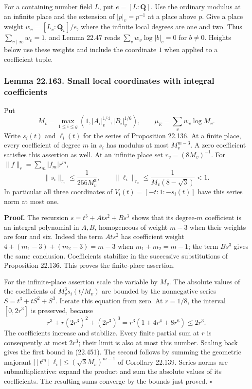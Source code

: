 \documentclass[
  11pt,
  a4paper,
]{article}
\begin{document}
For a containing number field \(L\), put \(e=[L:\mathbf Q]\). Use the
ordinary modulus at an infinite place and the extension of
\(|p|_v=p^{-1}\) at a place above \(p\). Give a place weight
\(w_v=[L_v:\mathbf Q_v]/e\), where the infinite local degrees are one
and two. Thus \(\sum_{v\mid\infty}w_v=1\), and Lemma 22.47 reads
\(\sum_vw_v\log|b|_v=0\) for \(b\ne0\). Heights below use these weights
and include the coordinate \(1\) when applied to a coefficient tuple.

\subsubsection{Lemma 22.163. Small local coordinates with integral
coefficients}\label{lemma-22.163.-small-local-coordinates-with-integral-coefficients}

Put \[
 M_v=\max_{1\le i\le g}
       (1,|A_i|_v^{1/4},|B_i|_v^{1/6}),\qquad
 \mu_E=\sum_vw_v\log M_v.
 \tag{22.450}
\] Write \(s_i(t)\) and \(\ell_i(t)\) for the series of Proposition
22.136. At a finite place, every coefficient of degree \(m\) in \(s_i\)
has modulus at most \(M_v^{m-3}\). A zero coefficient satisfies this
assertion as well. At an infinite place set \(r_v=(8M_v)^{-1}\). For
\(\|f\|_r=\sum_m|f_m|r^m\), \[
 \|s_i\|_{r_v}\le\frac1{256M_v^3},\qquad
 \|\ell_i\|_{r_v}\le\frac1{M_v(8-\sqrt3)}<1.
 \tag{22.451}
\] In particular all three coordinates of \(V_i(t)=[-t:1:-s_i(t)]\) have
this series norm at most one.

\textbf{Proof.} The recursion \(s=t^3+Ats^2+Bs^3\) shows that its
degree-\(m\) coefficient is an integral polynomial in \(A,B\),
homogeneous of weight \(m-3\) when their weights are four and six.
Indeed the term \(Ats^2\) has coefficient weight
\(4+(m_1-3)+(m_2-3)=m-3\) when \(m_1+m_2=m-1\); the term \(Bs^3\) gives
the same conclusion. Coefficients stabilize in the successive
substitutions of Proposition 22.136. This proves the finite-place
assertion.

For the infinite-place assertion scale the variable by \(M_v\). The
absolute values of the coefficients of \(M_v^3s_i(t/M_v)\) are bounded
by the nonnegative series \(S=t^3+tS^2+S^3\). Iterate this equation from
zero. At \(r=1/8\), the interval \([0,2r^3]\) is preserved, because \[
 r^3+r(2r^3)^2+(2r^3)^3
       =r^3(1+4r^4+8r^6)\le2r^3.
 \tag{22.452}
\] The coefficients increase and stabilize. Every finite partial sum at
\(r\) is consequently at most \(2r^3\); their limit is also at most this
number. Scaling back gives the first bound in (22.451). The second
follows by summing the geometric majorant
\(|[t^m]\ell_i|\le(\sqrt3 M_v)^{m-1}\) of Corollary 22.139. Series norms
are submultiplicative: expand the product and sum the absolute values of
its coefficients. The resulting sums converge by the bounds just proved.
\(\square\)
\end{document}
